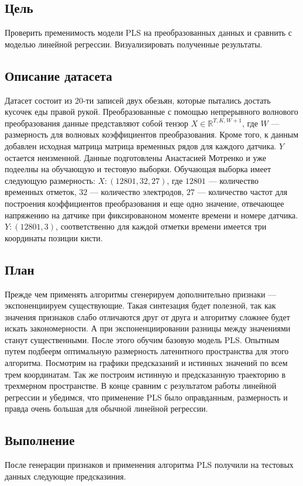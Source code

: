 \documentclass{article}
\begin{document}
\subsection{Цель}
Проверить пременимость модели PLS на преобразованных данных и сравнить с моделью линейной регрессии. Визуализировать полученные результаты.
\subsection{Описание датасета}
Датасет состоит из 20-ти записей двух обезьян, которые пытались достать кусочек еды правой рукой. Преобразованные с помощью непрерывного волнового преобразования данные представляют собой тензор $X \in \mathds{R}^{T, K, W+1}$, где $W$ --- размерность для волновых коэффициентов преобразования. Кроме того, к данным добавлен исходная матрица матрица временных рядов для каждого датчика. $Y$ остается неизменной. Данные подготовлены Анастасией Мотренко и уже подеелны на обучающую и тестовую выборки. Обучающая выборка имеет следующую размерность: $X:(12801, 32, 27)$, где $12801$ --- количество временных отметок, $32$ --- количество электродов, $27$ --- количество частот для построения коэффициентов преобразования и еще одно значение, отвечающее напряжению на датчике при фиксированоном моменте времени и номере датчика. $Y:(12801, 3)$, соответственно для каждой отметки времени имеется три координаты позиции кисти. \par
\subsection{План}
Прежде чем применять алгоритмы сгенерируем дополнительно признаки --- экспоненциируем существующие. Такая синтезация будет полезной, так как значения признаков слабо отличаются друг от друга и алгоритму сложнее будет искать закономерности. А при экспоненциировании разницы между значениями станут существенными. После этого обучим базовую модель PLS. Опытным путем подбеерм оптимальную размерность латеннтного пространства для этого алгоритма. Посмотрим на графики предсказаний и истинных значений по всем трем координатам. Так же построим истинную и предсказанную траекторию в трехмерном пространстве.  В конце сравним с результатом работы линейной регрессии и убедимся, что применение PLS было оправданным, размерность и правда очень большая для обычной линейной регрессии.
\subsection{Выполнение}
После генерации признаков и применения алгоритма PLS получили на тестовых данных следующие предсказиния.
\end{document}
